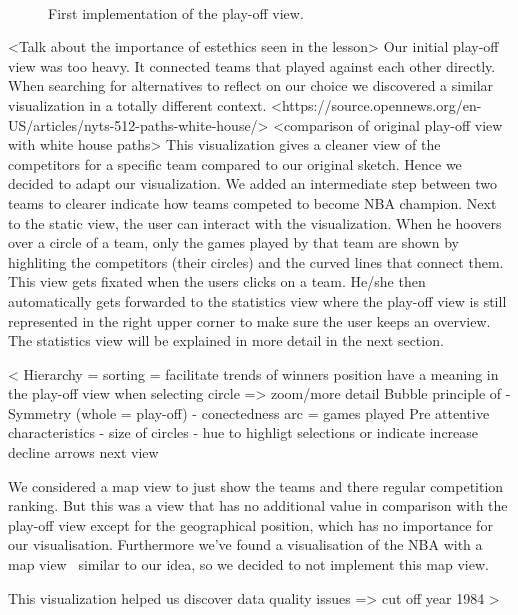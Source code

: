 \documentclass{sigchi}
\begin{document}
\begin{figure}
\centering
  \missingfigure{}
  \caption{First implementation of the play-off view.}~\label{fig:firstimplementationplayoffview}
\end{figure}

<Talk about the importance of estethics seen in the lesson>
Our initial play-off view was too heavy. It connected teams that played against
each other directly. When searching for alternatives to reflect on our choice we
discovered a similar visualization in a totally different context. 
<https://source.opennews.org/en-US/articles/nyts-512-paths-white-house/>
<comparison of original play-off view with white house paths>
This visualization gives a cleaner view of the competitors for a specific team
compared to our original sketch. Hence we decided to adapt our visualization. We
added an intermediate step between two teams to clearer indicate how teams competed
to become NBA champion.
Next to the static view, the user can interact with the visualization. When he 
hoovers over a circle of a team, only the games played by that team are shown by highliting the 
competitors (their circles) and the curved lines that connect them. This view gets 
fixated when the users clicks on a team.
He/she then automatically gets forwarded to the statistics view where the play-off 
view is still represented in the right upper corner to make sure the user keeps
an overview. The statistics view will be explained in more detail in the next section.


< Hierarchy = sorting = facilitate trends of winners
position have a meaning in the play-off view
when selecting circle => zoom/more detail
Bubble principle of 
- Symmetry (whole = play-off)
- conectedness arc = games played
Pre attentive characteristics
- size of circles
- hue to highligt selections or indicate increase decline arrows next view

We considered a map view to just show the teams and there regular competition ranking. But this was a view that has no additional value in comparison with the play-off view except for the geographical position, which has no importance for our visualisation. Furthermore we've found a visualisation of the NBA with a map view~\cite{mapviewvisualization} similar to our idea, so we decided to not implement this map view. 

This visualization helped us discover data quality issues => cut off year 1984
>
\end{document}
